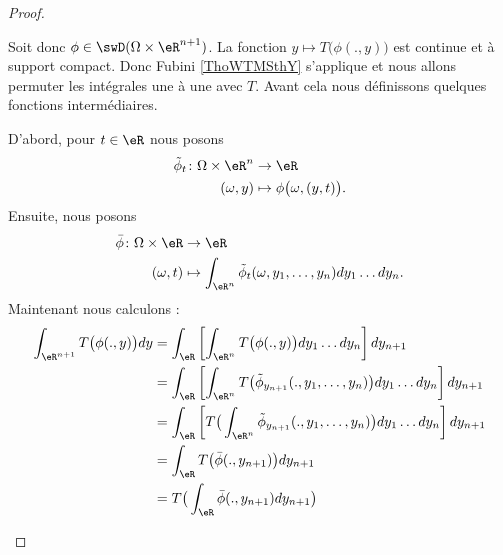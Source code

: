 \begin{proof}
\begin{subproof}
		Soit donc \( \phi\in\swD(\Omega\times \eR^{n+1})\). La fonction \( y\mapsto T\big( \phi(.,y) \big)\) est continue et à support compact. Donc Fubini \ref{ThoWTMSthY} s'applique et nous allons permuter les intégrales une à une avec \( T\). Avant cela nous définissons quelques fonctions intermédiaires.

		D'abord, pour \( t\in \eR\) nous posons
		\begin{equation}
			\begin{aligned}
				\tilde\phi_t\colon \Omega\times \eR^n & \to \eR                               \\
				(\omega,y)                            & \mapsto \phi\big( \omega,(y,t) \big).
			\end{aligned}
		\end{equation}
		Ensuite, nous posons
		\begin{equation}
			\begin{aligned}
				\bar \phi\colon \Omega\times \eR & \to \eR                                                                    \\
				(\omega,t)                       & \mapsto \int_{\eR^n}\tilde \phi_t(\omega, y_1,\ldots, y_n)dy_1\ldots dy_n.
			\end{aligned}
		\end{equation}
		Maintenant nous calculons :
		\begin{subequations}
			\begin{align}
				\int_{\eR^{n+1}}T\big( \phi(.,y) \big)dy & =\int_{\eR}\left[ \int_{\eR^n} T\big( \phi(.,y) \big)dy_1\ldots dy_n \right]dy_{n+1}       \label{SUBEQooBFEFooFVtHmz}                         \\
				                                         & =\int_{\eR}\left[ \int_{\eR^n}T\big( \tilde \phi_{y_{n+1}}(., y_1,\ldots, y_n) \big)dy_1\ldots dy_n \right]dy_{n+1}                            \\
				                                         & =\int_{\eR}\left[ T\big( \int_{\eR^n}\tilde \phi_{y_{n+1}}(.,y_1,\ldots, y_n) \big)dy_1\ldots dy_n \right]dy_{n+1} \label{SUBEQooROIEooVMbfii} \\
				                                         & =\int_{\eR}T\big( \bar\phi(.,y_{n+1}) \big)dy_{n+1}                                                                                            \\
				                                         & =T\big( \int_{\eR}\bar\phi(.,y_{n+1})dy_{n+1} \big)  \label{SUBEQooPFBOooMXUjXk}                                                               \\

\end{align}
\end{subequations}
\end{subproof}
\end{proof}
